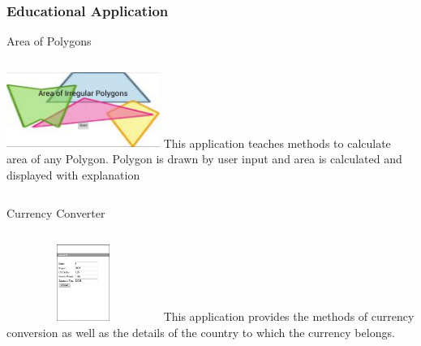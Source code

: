 \documentclass[12pt]{beamer}
\begin{document}
\begin{frame}[c]
\frametitle{Educational Application}
\begin{block}{Area of Polygons}
 \begin{columns}[c]
   \includegraphics[width=5cm]{images/screen5.png}
This application teaches methods to calculate area of any Polygon. Polygon is drawn by user input and area is calculated and displayed with explanation
 \end{columns}
 \end{block}
 
 \begin{block}{Currency Converter}
 \begin{columns}[c]
   \includegraphics[width=5cm, height=2.5cm]{images/currency}
   This application provides the methods of currency conversion as well as the details of the country to which the currency belongs.
 \end{columns}
\end{block}


\end{frame}
\end{document}
